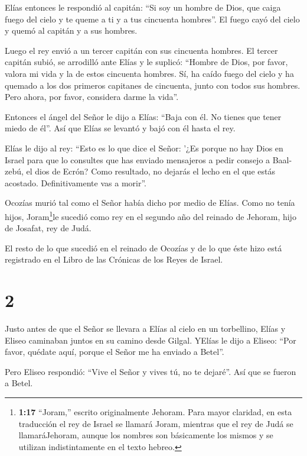  Elías entonces le respondió al capitán: ``Si soy un hombre
de Dios, que caiga fuego del cielo y te queme a ti y a tus cincuenta
hombres''. El fuego cayó del cielo y quemó al capitán y a sus hombres.

 Luego el rey envió a un tercer capitán con sus cincuenta
hombres. El tercer capitán subió, se arrodilló ante Elías y le suplicó:
``Hombre de Dios, por favor, valora mi vida y la de estos cincuenta
hombres.  Sí, ha caído fuego del cielo y ha quemado a los
dos primeros capitanes de cincuenta, junto con todos sus hombres. Pero
ahora, por favor, considera darme la vida''.

 Entonces el ángel del Señor le dijo a Elías: ``Baja con
él. No tienes que tener miedo de él''. Así que Elías se levantó y bajó
con él hasta el rey.

 Elías le dijo al rey: ``Esto es lo que dice el Señor: '¿Es
porque no hay Dios en Israel para que lo consultes que has enviado
mensajeros a pedir consejo a Baal-zebú, el dios de Ecrón? Como
resultado, no dejarás el lecho en el que estás acostado. Definitivamente
vas a morir''.

 Ocozías murió tal como el Señor había dicho por medio de
Elías. Como no tenía hijos, Joram\footnote{\textbf{1:17} ``Joram,''
  escrito originalmente Jehoram. Para mayor claridad, en esta traducción
  el rey de Israel se llamará Joram, mientras que el rey de Judá se
  llamaráJehoram, aunque los nombres son básicamente los mismos y se
  utilizan indistintamente en el texto hebreo.}le sucedió como rey en el
segundo año del reinado de Jehoram, hijo de Josafat, rey de Judá.

 El resto de lo que sucedió en el reinado de Ocozías y de
lo que éste hizo está registrado en el Libro de las Crónicas de los
Reyes de Israel.

\hypertarget{section-1}{%
\section{2}\label{section-1}}

 Justo antes de que el Señor se llevara a Elías al cielo en
un torbellino, Elías y Eliseo caminaban juntos en su camino desde
Gilgal.  YElías le dijo a Eliseo: ``Por favor, quédate aquí,
porque el Señor me ha enviado a Betel''.

Pero Eliseo respondió: ``Vive el Señor y vives tú, no te dejaré''. Así
que se fueron a Betel.

